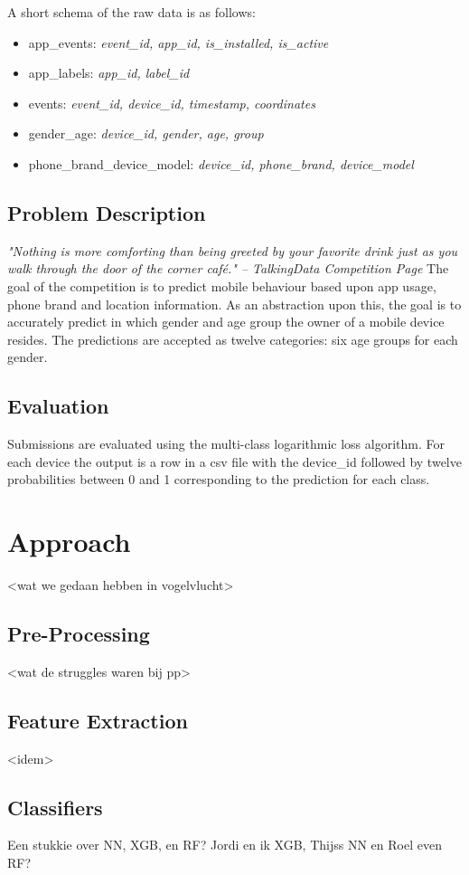 \documentclass[runningheads,a4paper]{llncs}
\begin{document}
A short schema of the raw data is as follows:
\begin{itemize}
\item app\_events: \textit{event\_id, app\_id, is\_installed, is\_active}
\item app\_labels: \textit{app\_id, label\_id}
\item events: \textit{event\_id, device\_id, timestamp, coordinates}
\item gender\_age: \textit{device\_id, gender, age, group}
\item phone\_brand\_device\_model: \textit{device\_id, phone\_brand, device\_model}
\end{itemize}

\subsection{Problem Description}
\textit{"Nothing is more comforting than being greeted by your favorite drink just as you walk through the door of the corner café." -- TalkingData Competition Page } 
\smallskip
\newline
\noindent
The goal of the competition is to predict mobile behaviour based upon app usage, phone brand and location information. As an abstraction upon this, the goal is to accurately predict in which gender and age group the owner of a mobile device resides. The predictions are accepted as twelve categories: six age groups for each gender. 
\subsection{Evaluation}
Submissions are evaluated using the multi-class logarithmic loss algorithm. For each device the output is a row in a csv file with the device\_id followed by twelve probabilities between 0 and 1 corresponding to the prediction for each class.
\section{Approach}
<wat we gedaan hebben in vogelvlucht>
\subsection{Pre-Processing}
<wat de struggles waren bij pp>
\subsection{Feature Extraction}
<idem>
\subsection{Classifiers}
Een stukkie over NN, XGB, en RF? Jordi en ik XGB, Thijss NN en Roel even RF?
\end{document}

